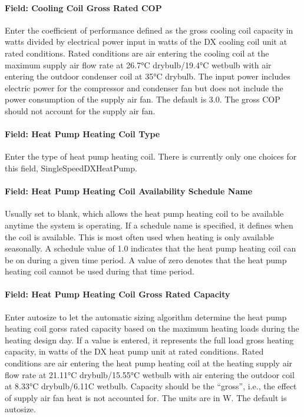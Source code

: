 \paragraph{Field: Cooling Coil Gross Rated COP}\label{field-cooling-coil-gross-rated-cop}

Enter the coefficient of performance defined as the gross cooling coil capacity in watts divided by electrical power input in watts of the DX cooling coil unit at rated conditions. Rated conditions are air entering the cooling coil at the maximum supply air flow rate at 26.7°C drybulb/19.4°C wetbulb with air entering the outdoor condenser coil at 35°C drybulb. The input power includes electric power for the compressor and condenser fan but does not include the power consumption of the supply air fan. The default is 3.0. The gross COP should not account for the supply air fan.

\paragraph{Field: Heat Pump Heating Coil Type}\label{field-heat-pump-heating-coil-type}

Enter the type of heat pump heating coil. There is currently only one choices for this field, SingleSpeedDXHeatPump.

\paragraph{Field: Heat Pump Heating Coil Availability Schedule Name}\label{field-heat-pump-heating-coil-availability-schedule-name}

Usually set to blank, which allows the heat pump heating coil to be available anytime the system is operating. If a schedule name is specified, it defines when the coil is available. This is most often used when heating is only available seasonally. A schedule value of 1.0 indicates that the heat pump heating coil can be on during a given time period. A value of zero denotes that the heat pump heating coil cannot be used during that time period.

\paragraph{Field: Heat Pump Heating Coil Gross Rated Capacity}\label{field-heat-pump-heating-coil-gross-rated-capacity}

Enter autosize to let the automatic sizing algorithm determine the heat pump heating coil gorss rated capacity based on the maximum heating loads during the heating design day. If a value is entered, it represents the full load gross heating capacity, in watts of the DX heat pump unit at rated conditions. Rated conditions are air entering the heat pump heating coil at the heating supply air flow rate at 21.11°C drybulb/15.55°C wetbulb with air entering the outdoor coil at 8.33°C drybulb/6.11C wetbulb. Capacity should be the ``gross'', i.e., the effect of supply air fan heat is not accounted for. The units are in W. The default is autosize.

